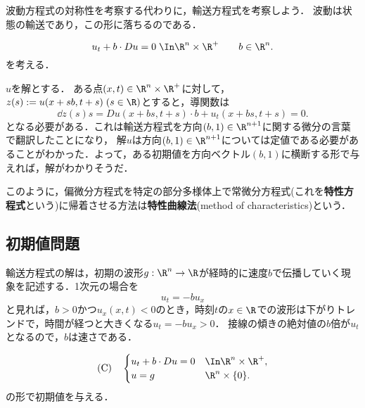 \documentclass[uplatex,dvipdfmx]{jsreport}
\begin{document}
\begin{tcolorbox}[colframe=ForestGreen, colback=ForestGreen!10!white,breakable,colbacktitle=ForestGreen!40!white,coltitle=black,fonttitle=\bfseries\sffamily,
title=]
    波動方程式の対称性を考察する代わりに，輸送方程式を考察しよう．
    波動は状態の輸送であり，この形に落ちるのである．
\end{tcolorbox}

\begin{problem}
    \[u_t+b\cdot Du=0\;\In\R^n\times\R^+\qquad b\in\R^n.\]
    を考える．
\end{problem}

\begin{observation}[輸送方程式の幾何学的意味]
    $u$を解とする．
    ある点$(x,t)\in\R^n\times\R^+$に対して，$z(s):=u(x+sb,t+s)\;(s\in\R)$とすると，導関数は
    \[\dd{z(s)}{s}=Du(x+bs,t+s)\cdot b+u_t(x+bs,t+s)=0.\]
    となる必要がある．これは輸送方程式を方向$(b,1)\in\R^{n+1}$に関する微分の言葉で翻訳したことになり，
    解$u$は方向$(b,1)\in\R^{n+1}$については定値である必要があることがわかった．よって，ある初期値を方向ベクトル$(b,1)$に横断する形で与えれば，解がわかりそうだ．
\end{observation}
\begin{remarks}
    このように，偏微分方程式を特定の部分多様体上で常微分方程式(これを\textbf{特性方程式}という)に帰着させる方法は\textbf{特性曲線法}(method of characteristics)という．
\end{remarks}

\subsection{初期値問題}

\begin{tcolorbox}[colframe=ForestGreen, colback=ForestGreen!10!white,breakable,colbacktitle=ForestGreen!40!white,coltitle=black,fonttitle=\bfseries\sffamily,
title=]
    輸送方程式の解は，初期の波形$g:\R^n\to\R$が経時的に速度$b$で伝播していく現象を記述する．1次元の場合を
    \[u_t=-bu_x\]
    と見れば，$b>0$かつ$u_x(x,t)<0$のとき，時刻$t$の$x\in\R$での波形は下がりトレンドで，時間が経つと大きくなる$u_t=-bu_x>0$．
    接線の傾きの絶対値の$b$倍が$u_t$となるので，$b$は速さである．
\end{tcolorbox}

\begin{problem}
    \[\text{(C)}\quad\begin{cases}
        u_t+b\cdot Du=0&\In \R^n\times\R^+,\\
        u=g&\R^n\times\{0\}.
    \end{cases}\]
    の形で初期値を与える．
\end{problem}
\end{document}
